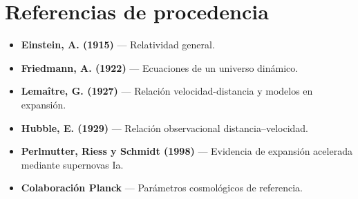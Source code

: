 \section*{Referencias de procedencia}

\begin{itemize}
  \item \textbf{Einstein, A. (1915)} --- Relatividad general.
  \item \textbf{Friedmann, A. (1922)} --- Ecuaciones de un universo dinámico.
  \item \textbf{Lemaître, G. (1927)} --- Relación velocidad-distancia y modelos en expansión.
  \item \textbf{Hubble, E. (1929)} --- Relación observacional distancia--velocidad.
  \item \textbf{Perlmutter, Riess y Schmidt (1998)} --- Evidencia de expansión acelerada mediante supernovas Ia.
  \item \textbf{Colaboración Planck} --- Parámetros cosmológicos de referencia.
\end{itemize}


